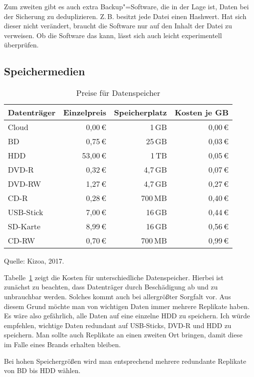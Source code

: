 \documentclass[a4paper,11pt,fleqn,twocolumn,twoside]{scrartcl}
\newcommand{\strong}[1]{\textsf{\textbf{#1}}}
\newcommand{\smallstrong}[1]{{\footnotesize\strong{#1}}}
\begin{document}
Zum zweiten gibt es auch extra Backup"=Software, die in der Lage ist,
Daten bei der Sicherung zu deduplizieren. Z.\,B. besitzt jede
Datei einen Hashwert. Hat sich dieser nicht verändert, braucht die
Software nur auf den Inhalt der Datei zu verweisen. Ob die Software
das kann, lässt sich auch leicht experimentell überprüfen.

\subsection{Speichermedien}

\begin{table}
\begin{tabular}{@{}lrrr@{}}
\toprule
\smallstrong{Datenträger} & \smallstrong{Einzelpreis}
& \smallstrong{Speicherplatz} & \smallstrong{Kosten je GB}\\
\midrule
Cloud    &  0,00\,€ &  1\,GB & 0,00\,€\\ 
BD       &  0,75\,€ & 25\,GB & 0,03\,€\\
HDD      & 53,00\,€ &  1\,TB & 0,05\,€\\
\midrule
DVD-R    &  0,32\,€ &4,7\,GB & 0,07\,€\\
DVD-RW   &  1,27\,€ &4,7\,GB & 0,27\,€\\
CD-R     &  0,28\,€ &700\,MB & 0,40\,€\\
\midrule
USB-Stick&  7,00\,€ & 16\,GB & 0,44\,€\\
SD-Karte &  8,99\,€ & 16\,GB & 0,56\,€\\
CD-RW    &  0,70\,€ &700\,MB & 0,99\,€\\
\bottomrule
\end{tabular}
\caption{Preise für Datenspeicher}\label{Datenspeicher}
Quelle: Kizoa, 2017.
\end{table}

Tabelle~\ref{Datenspeicher} zeigt die Kosten für unterschiedliche
Datenspeicher. Hierbei ist zunächst zu beachten, dass Datenträger
durch Beschädigung ab und zu unbrauchbar werden. Solches kommt auch
bei allergrößter Sorgfalt vor. Aus diesem Grund möchte man von
wichtigen Daten immer mehrere Replikate haben. Es wäre also gefährlich,
alle Daten auf eine einzelne HDD zu speichern. Ich würde empfehlen,
wichtige Daten redundant auf USB-Sticks, DVD-R und HDD zu
speichern. Man sollte auch Replikate an einen zweiten Ort bringen,
damit diese im Falle eines Brands erhalten bleiben.

Bei hohen Speichergrößen wird man entsprechend mehrere
redundante Replikate von BD bis HDD wählen.
\end{document}
